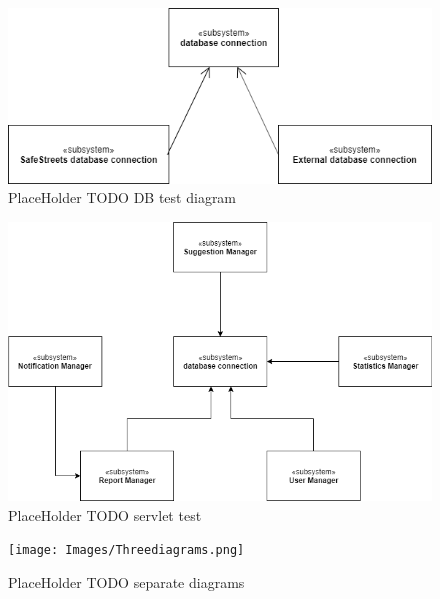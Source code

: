 \begin{figure}[H]
\centering
\includegraphics[width=\textwidth]{Images/TestDBdiagram.png}
\caption{\label{fig:ComWI}PlaceHolder TODO DB test diagram}
\end{figure}
\begin{figure}[H]
\centering
\includegraphics[width=\textwidth]{Images/TestServlet.png}
\caption{\label{fig:ComWI}PlaceHolder TODO servlet test}
\end{figure}
\begin{figure}[H]
\centering
\texttt{[image: Images/Threediagrams.png]}
\caption{\label{fig:ComWI}PlaceHolder TODO separate diagrams}
\end{figure}
